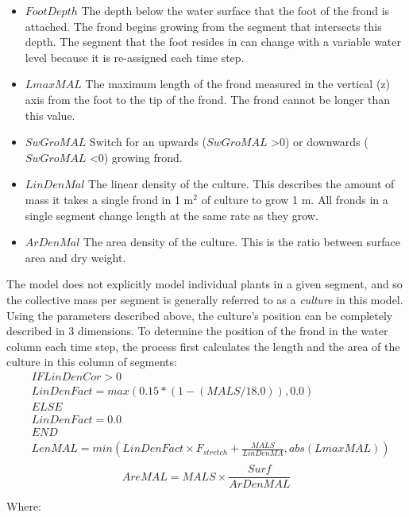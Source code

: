 \documentclass{deltares_manual}
\begin{document}
\begin{itemize}
\item $FootDepth$ The depth below the water surface that the foot of the frond is attached. The frond begins growing from the segment that intersects this depth. The segment that the foot resides in can change with a variable water level because it is re-assigned each time step.
\item $LmaxMAL$ The maximum length of the frond measured in the vertical (z) axis from the foot to the tip of the frond. The frond cannot be longer than this value.
\item $SwGroMAL$ Switch for an upwards ($SwGroMAL$ \textgreater 0) or downwards ($SwGroMAL$ \textless 0) growing frond.
\item $LinDenMal$ The linear density of the culture. This describes the amount of mass it takes a single frond in 1 m$^{2}$ of culture to grow 1 m. All fronds in a single segment change length at the same rate as they grow.
\item $ArDenMal$ The area density of the culture. This is the ratio between surface area and dry weight.
\end{itemize}

The model does not explicitly model individual plants in a given segment, and so the collective mass per segment is generally referred to as a \textit{culture} in this model. Using the parameters described above, the culture's position can be completely described in 3 dimensions. To determine the position of the frond in the water column each time step, the process first calculates the length and the area of the culture in this column of segments:
\begin{equation}
\begin{aligned}
	&IF LinDenCor > 0\\
	&	LinDenFact = max(0.15 * (1 - (MALS/18.0)), 0.0)\\
	&ELSE\\
	&	LinDenFact = 0.0\\
	&END\\
	&LenMAL = min(LinDenFact \times F_{stretch} + \frac{MALS}{LinDenMA}, abs(LmaxMAL))\\
\end{aligned}
\end{equation}
\begin{equation}
	AreMAL = MALS \times \frac{Surf}{ArDenMAL}
\end{equation}


Where:\\
\end{document}
